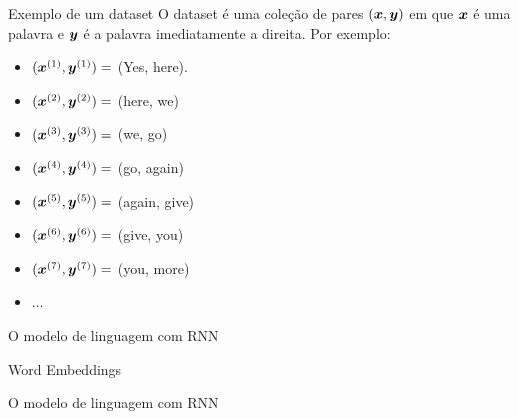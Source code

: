 \documentclass[10pt]{beamer}
\begin{document}
\begin{frame}{Exemplo de um dataset}
O dataset é uma coleção de pares $(\bm{x},\bm{y})$ em que $\bm{x}$ é uma palavra e $\bm{y}$ é a palavra imediatamente a direita. Por exemplo:
\begin{itemize}
\item [] $(\bm{x}^{(1)}, \bm{y}^{(1)}) =$ (Yes, here).
\item [] $(\bm{x}^{(2)}, \bm{y}^{(2)}) =$ (here, we)
\item [] $(\bm{x}^{(3)}, \bm{y}^{(3)}) =$ (we, go)
\item [] $(\bm{x}^{(4)}, \bm{y}^{(4)}) =$ (go, again)
\item [] $(\bm{x}^{(5)}, \bm{y}^{(5)}) =$ (again, give)
\item [] $(\bm{x}^{(6)}, \bm{y}^{(6)}) =$ (give, you)
\item [] $(\bm{x}^{(7)}, \bm{y}^{(7)}) =$ (you, more)
\item [] $\dots$
\end{itemize}
\end{frame}


\begin{frame}{O modelo de linguagem com RNN}

\end{frame}

\begin{frame}{Word Embeddings}

\end{frame}


\begin{frame}{O modelo de linguagem com RNN}

\end{frame}
\end{document}
